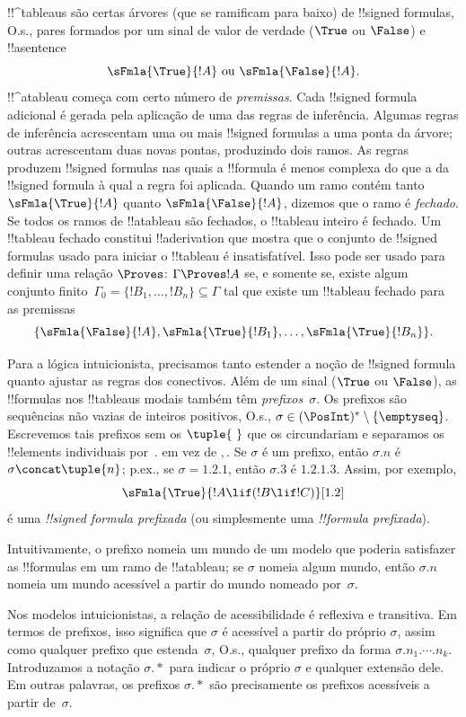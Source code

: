 \documentclass[../../../include/open-logic-section]{subfiles}
\begin{document}


!!^{tableau}s são certas árvores (que se ramificam para baixo) de !!{signed
  formula}s, O.s.\@, pares formados por um sinal de valor de verdade ($\True$ ou
$\False$) e !!a{sentence}
\[
\sFmla{\True}{!A} \text{ ou } \sFmla{\False}{!A}.
\]
!!^a{tableau} começa com certo número de \emph{premissas}. Cada
!!{signed formula} adicional é gerada pela aplicação de uma das regras de
inferência. Algumas regras de inferência acrescentam uma ou mais !!{signed formula}s a uma
ponta da árvore; outras acrescentam duas novas pontas, produzindo dois ramos.
As regras produzem !!{signed formula}s nas quais a !!{formula} é
menos complexa do que a da !!{signed formula} à qual a regra foi
aplicada. Quando um ramo contém tanto $\sFmla{\True}{!A}$ quanto
$\sFmla{\False}{!A}$, dizemos que o ramo é \emph{fechado}. Se todos os
ramos de !!a{tableau} são fechados, o !!{tableau} inteiro é fechado. Um
!!{tableau} fechado constitui !!a{derivation} que mostra que o conjunto
de !!{signed formula}s usado para iniciar o !!{tableau} é
insatisfatível. Isso pode ser usado para definir uma relação $\Proves$:
$\Gamma \Proves !A$ se, e somente se, existe algum conjunto finito~$\Gamma_0 = \{!B_1,
\dots, !B_n\} \subseteq \Gamma$ tal que existe um
!!{tableau} fechado para as premissas
\[
\{\sFmla{\False}{!A}, \sFmla{\True}{!B_1}, \dots, \sFmla{\True}{!B_n}\}.
\]

Para a lógica intuicionista, precisamos tanto estender a noção de
!!{signed formula} quanto ajustar as regras dos conectivos. Além
de um sinal ($\True$ ou $\False$), as !!{formula}s nos
!!{tableau}s modais também têm \emph{prefixos}~$\sigma$. Os prefixos são
sequências não vazias de inteiros positivos, O.s.\@, $\sigma \in
(\PosInt)^* \setminus \{\emptyseq\}$. Escrevemos tais prefixos
sem os $\tuple{\ }$ que os circundariam e separamos os
!!{element}s individuais por~$.$ em vez de $,$. Se $\sigma$ é um prefixo, então
$\sigma.n$ é $\sigma \concat \tuple{n}$; p.ex., se $\sigma = 1.2.1$,
então $\sigma.3$ é $1.2.1.3$. Assim, por exemplo,
\[
\sFmla{\True}{!A \lif (!B \lif !C)}[1.2]
\]
é uma \emph{!!{signed formula} prefixada} (ou simplesmente uma \emph{
  !!{formula} prefixada}).

Intuitivamente, o prefixo nomeia um mundo de um modelo que poderia satisfazer
as !!{formula}s em um ramo de !!a{tableau}; se $\sigma$ nomeia
algum mundo, então $\sigma.n$ nomeia um mundo acessível a partir do mundo
nomeado por~$\sigma$.

Nos modelos intuicionistas, a relação de acessibilidade é reflexiva e
transitiva. Em termos de prefixos, isso significa que $\sigma$ é
acessível a partir do próprio $\sigma$, assim como qualquer prefixo que
estenda~$\sigma$, O.s.\@, qualquer prefixo da forma
$\sigma.n_1.\cdots.n_k$. Introduzamos a notação $\sigma.*$ para
indicar o próprio $\sigma$ e qualquer extensão dele. Em outras palavras, os
prefixos $\sigma.*$ são precisamente os prefixos acessíveis
a partir de~$\sigma$.
\end{document}
